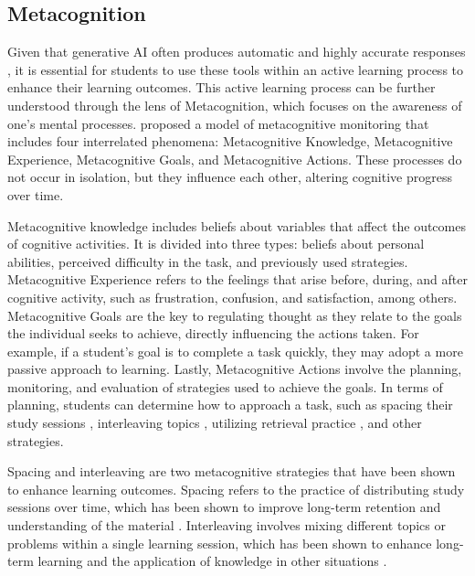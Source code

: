 \documentclass[a4paper,twoside]{article}
\begin{document}
\subsection{Metacognition}

Given that generative AI often produces automatic and highly accurate responses
\citep{Puryear22}, it is essential for students to use these tools within an
active learning process to enhance their learning outcomes. This active
learning process can be further understood through the lens of Metacognition,
which focuses on the awareness of one’s mental processes. \cite{flavell79}
proposed a model of metacognitive monitoring that includes four interrelated
phenomena: Metacognitive Knowledge, Metacognitive Experience, Metacognitive
Goals, and Metacognitive Actions. These processes do not occur in isolation, but
they influence each other, altering cognitive progress over time.

Metacognitive knowledge includes beliefs about variables that affect the
outcomes of cognitive activities. It is divided into three types: beliefs about
personal abilities, perceived difficulty in the task, and previously used
strategies. Metacognitive Experience refers to the feelings that arise
before, during, and after cognitive activity, such as frustration, confusion,
and satisfaction, among others. Metacognitive Goals are the key to regulating
thought as they relate to the goals the individual seeks to achieve, directly
influencing the actions taken. For example, if a student’s goal is to complete
a task quickly, they may adopt a more passive approach to learning. Lastly,
Metacognitive Actions involve the planning, monitoring, and evaluation of
strategies used to achieve the goals. In terms of planning, students can
determine how to approach a task, such as spacing their study sessions
\citep{Ouhao18, Carvalho20}, interleaving topics \citep{Rivers21}, utilizing
retrieval practice \citep{larsen18}, and other strategies.

Spacing and interleaving are two metacognitive strategies that have been shown to
enhance learning outcomes. Spacing refers to the practice of distributing study
sessions over time, which has been shown to improve long-term retention and
understanding of the material \citep{Carvalho20}. Interleaving involves mixing
different topics or problems within a single learning session, which has been
shown to enhance long-term learning and the application of knowledge in other
situations \citep{Rivers21}.
\end{document}
